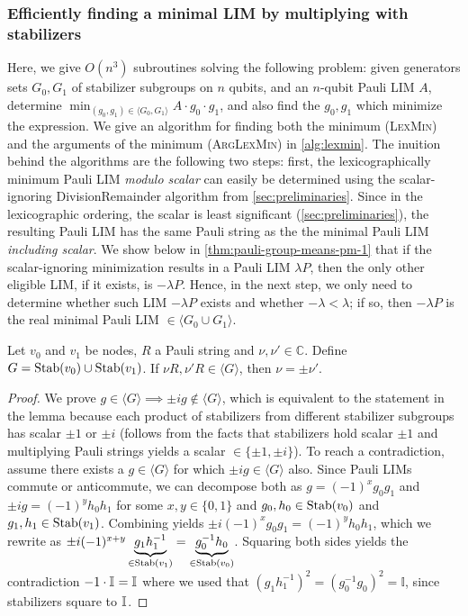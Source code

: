 \subsubsection{Efficiently finding a minimal LIM by multiplying with stabilizers}
\label{sec:lexmin}

Here, we give $O(n^3)$ subroutines solving the following problem: given generators sets $G_0, G_1$ of stabilizer subgroups on $n$ qubits, and an $n$-qubit Pauli LIM $A$, determine $\min_{(g_0, g_1) \in \langle G_0 , G_1 \rangle} A \cdot g_0 \cdot g_1$, and also find the $g_0, g_1$ which minimize the expression.
We give an algorithm for finding both the minimum (\textsc{LexMin}) and the arguments of the minimum (\textsc{ArgLexMin}) in \autoref{alg:lexmin}.
The inuition behind the algorithms are the following two steps: first, the lexicographically minimum Pauli LIM \emph{modulo scalar} can easily be determined using the scalar-ignoring DivisionRemainder algorithm from \autoref{sec:preliminaries}.
Since in the lexicographic ordering, the scalar is least significant (\autoref{sec:preliminaries}), the resulting Pauli LIM has the same Pauli string as the the minimal Pauli LIM \emph{including scalar}.
We show below in \autoref{thm:pauli-group-means-pm-1} that if the scalar-ignoring minimization results in a Pauli LIM $\lambda P$, then the only other eligible LIM, if it exists, is $-\lambda P$.
Hence, in the next step, we only need to determine whether such LIM $-\lambda P$ exists and whether $- \lambda < \lambda$; if so, then $-\lambda P$ is the real minimal Pauli LIM $\in \langle G_0 \cup G_1\rangle$.

\begin{lemma}
	\label{thm:pauli-group-means-pm-1}
    Let $v_0$ and $v_1$ be \limdd nodes, $R$ a Pauli string and $\nu, \nu' \in \mathbb{C}$.
    Define $G = \text{Stab}(v_0) \cup \text{Stab}(v_1)$.
If $\nu R, \nu' R \in \langle G\rangle$, then $\nu = \pm \nu'$.
\end{lemma}
\begin{proof}
    We prove $g \in \langle G \rangle \implies \pm i g \notin \langle G \rangle$, which is equivalent to the statement in the lemma because each product of stabilizers from different stabilizer subgroups has scalar $\pm 1$ or $\pm i$ (follows from the facts that stabilizers hold scalar $\pm 1$ and multiplying Pauli strings yields a scalar $\in \{\pm 1, \pm i\}$).
    To reach a contradiction, assume there exists a $g\in \langle G \rangle$ for which $\pm i g \in \langle G \rangle$ also.
    Since Pauli LIMs commute or anticommute, we can decompose both as $g = (-1)^x g_0 g_1$ and $\pm i g = (-1)^y h_0 h_1$ for some $x, y \in \{0, 1\}$ and $g_0, h_0\in \text{Stab}(v_0)$ and $g_1, h_1 \in \text{Stab}(v_1)$.
    Combining yields $\pm i (-1)^x g_0 g_1 = (-1)^y h_0 h_1$, which we rewrite as $\pm i (-1)^{x+y} \underbrace{g_1 h_1^{-1}}_{\in \text{Stab}(v_1)} = \underbrace{g_0^{-1} h_0}_{\in \text{Stab}(v_0)}$. 
    Squaring both sides yields the contradiction $-1 \cdot \mathbb{I}_{} = \mathbb{I}_{}$ where we used that $(g_1h_1^{-1})^2=(g_0^{-1}g_0)^2=\mathbb I$, since stabilizers square to $\mathbb{I}_{}$.
\end{proof}

